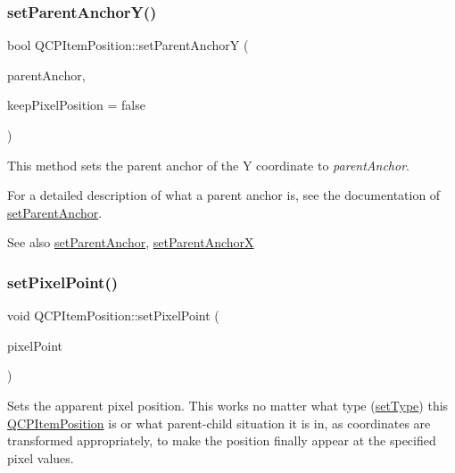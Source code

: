 \subsubsection{\texorpdfstring{set\+Parent\+Anchor\+Y()}{setParentAnchorY()}}
{\footnotesize\ttfamily bool Q\+C\+P\+Item\+Position\+::set\+Parent\+AnchorY (\begin{DoxyParamCaption}\item[{\mbox{\hyperlink{class_q_c_p_item_anchor}{Q\+C\+P\+Item\+Anchor}} $\ast$}]{parent\+Anchor,  }\item[{bool}]{keep\+Pixel\+Position = {\ttfamily false} }\end{DoxyParamCaption})}

This method sets the parent anchor of the Y coordinate to {\itshape parent\+Anchor}.

For a detailed description of what a parent anchor is, see the documentation of \mbox{\hyperlink{class_q_c_p_item_position_ac094d67a95d2dceafa0d50b9db3a7e51}{set\+Parent\+Anchor}}.

\begin{DoxySeeAlso}{See also}
\mbox{\hyperlink{class_q_c_p_item_position_ac094d67a95d2dceafa0d50b9db3a7e51}{set\+Parent\+Anchor}}, \mbox{\hyperlink{class_q_c_p_item_position_add71461a973927c74e42179480916d9c}{set\+Parent\+AnchorX}} 
\end{DoxySeeAlso}
\mbox{\label{class_q_c_p_item_position_ab404e56d9ac2ac2df0382c57933a71ef}} 
\subsubsection{\texorpdfstring{set\+Pixel\+Point()}{setPixelPoint()}}
{\footnotesize\ttfamily void Q\+C\+P\+Item\+Position\+::set\+Pixel\+Point (\begin{DoxyParamCaption}\item[{const Q\+PointF \&}]{pixel\+Point }\end{DoxyParamCaption})}

Sets the apparent pixel position. This works no matter what type (\mbox{\hyperlink{class_q_c_p_item_position_aa476abf71ed8fa4c537457ebb1a754ad}{set\+Type}}) this \mbox{\hyperlink{class_q_c_p_item_position}{Q\+C\+P\+Item\+Position}} is or what parent-\/child situation it is in, as coordinates are transformed appropriately, to make the position finally appear at the specified pixel values.

